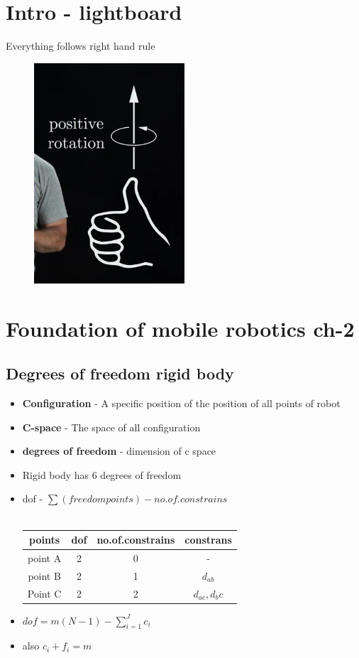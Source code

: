 \documentclass[a4paper]{article}
\begin{document}
\section{Intro - lightboard}
Everything follows right hand rule
\begin{figure}[htpb]
	\centering
	\includegraphics[width=0.5\textwidth]{postiveRotaion.png}
	\caption{}
	\label{fig:}
\end{figure}
\section{Foundation of mobile robotics ch-2}
\subsection{Degrees of freedom rigid body}
\begin{itemize}
	\item \textbf{Configuration} - A specific position of the position of all points of robot
	\item \textbf{C-space} - The space of all configuration
	\item \textbf{degrees of freedom} - dimension of c space
	\item Rigid body has 6 degrees of freedom

	\item dof - $\sum (freedom points) - no.of.constrains$ \\\
	      \begin{tabular}{|c|c|c|c|}
		      \hline
		      points  & dof & no.of.constrains & constrans       \\
		      \hline
		      point A & 2   & 0                & -               \\
		      point B & 2   & 1                & $d_{ab}$        \\
		      Point C & 2   & 2                & $d_{ac},{d_bc}$ \\
		      \hline
	      \end{tabular}
	\item $dof = m(N-1) - \sum_{i=1}^J c_i$
	\item also $c_i + f_i = m$
\end{itemize}
\end{document}
